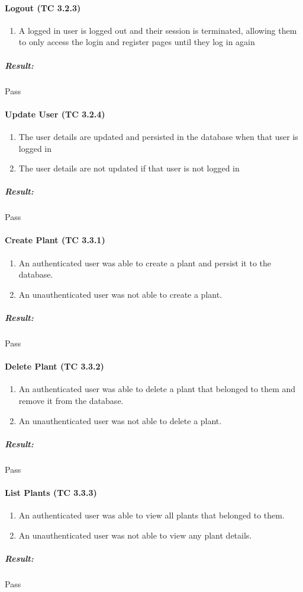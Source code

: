 \documentclass{article}
\begin{document}
			\paragraph{Logout (TC 3.2.3)}
				\begin{enumerate}
					\item A logged in user is logged out and their session is terminated, allowing them to only access the login and register pages until they log in again
				\end{enumerate}
				\subparagraph{Result: } Pass
			
			\paragraph{Update User (TC 3.2.4)}
				\begin{enumerate}
					\item The user details are updated and persisted in the database when that user is logged in
					\item The user details are not updated if that user is not logged in
				\end{enumerate}
				\subparagraph{Result: } Pass
			
			\paragraph{Create Plant (TC 3.3.1)}
				\begin{enumerate}
					\item An authenticated user was able to create a plant and persist it to the database.
					\item An unauthenticated user was not able to create a plant.
				\end{enumerate}
				\subparagraph{Result: } Pass
				
			\paragraph{Delete Plant (TC 3.3.2)}
				\begin{enumerate}
					\item An authenticated user was able to delete a plant that belonged to them and remove it from the database.
					\item An unauthenticated user was not able to delete a plant.
				\end{enumerate}
				\subparagraph{Result: } Pass
				
			\paragraph{List Plants (TC 3.3.3)}
				\begin{enumerate}
					\item An authenticated user was able to view all plants that belonged to them.
					\item An unauthenticated user was not able to view any plant details.
				\end{enumerate}
				\subparagraph{Result: } Pass
				
\end{document}
